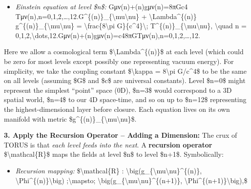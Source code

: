 \documentclass[
]{article}
\begin{document}
\begin{itemize}
\item
  \emph{Einstein equation at level \$n\$:}
  Gμν(n)+\Lambda(n)gμν(n)=8πGc4  Tμν(n),n=0,1,2,\ldots,12.G\^{}\{(n)\}\_\{\textbackslash mu\textbackslash nu\}
  + \textbackslash Lambda\^{}\{(n)\}
  g\^{}\{(n)\}\_\{\textbackslash mu\textbackslash nu\} =
  \textbackslash frac\{8\textbackslash pi G\}\{c\^{}4\}\textbackslash;
  T\^{}\{(n)\}\_\{\textbackslash mu\textbackslash nu\},
  \textbackslash quad n =
  0,1,2,\textbackslash dots,12.Gμν(n)\hspace{0pt}+\Lambda(n)gμν(n)\hspace{0pt}=c48πG\hspace{0pt}Tμν(n)\hspace{0pt},n=0,1,2,\ldots,12.
\end{itemize}

Here we allow a cosmological term \$\textbackslash Lambda\^{}\{(n)\}\$
at each level (which could be zero for most levels except possibly one
representing vacuum energy). For simplicity, we take the coupling
constant \$\textbackslash kappa = 8\textbackslash pi G/c\^{}4\$ to be
the same on all levels (assuming \$G\$ and \$c\$ are universal
constants)\hspace{0pt}. Level \$n=0\$ might represent the simplest
``point'' space (0D), \$n=3\$ would correspond to a 3D spatial world,
\$n=4\$ to our 4D space-time, and so on up to \$n=12\$ representing the
highest-dimensional layer before closure. Each equation lives on its own
manifold with metric
\$g\^{}\{(n)\}\_\{\textbackslash mu\textbackslash nu\}\$.

\textbf{3. Apply the Recursion Operator -- Adding a Dimension:} The crux
of TORUS is that \emph{each level feeds into the next}. A
\textbf{recursion operator} \$\textbackslash mathcal\{R\}\$ maps the
fields at level \$n\$ to level \$n+1\$. Symbolically\hspace{0pt}:

\begin{itemize}
\item
  \emph{Recursion mapping:} \$\textbackslash mathcal\{R\} :
  \textbackslash big(g\_\{\textbackslash mu\textbackslash nu\}\^{}\{(n)\},
  \textbackslash Phi\^{}\{(n)\}\textbackslash big)
  ;\textbackslash mapsto;
  \textbackslash big(g\_\{\textbackslash mu\textbackslash nu\}\^{}\{(n+1)\},
  \textbackslash Phi\^{}\{(n+1)\}\textbackslash big),\$
\end{itemize}
\end{document}
